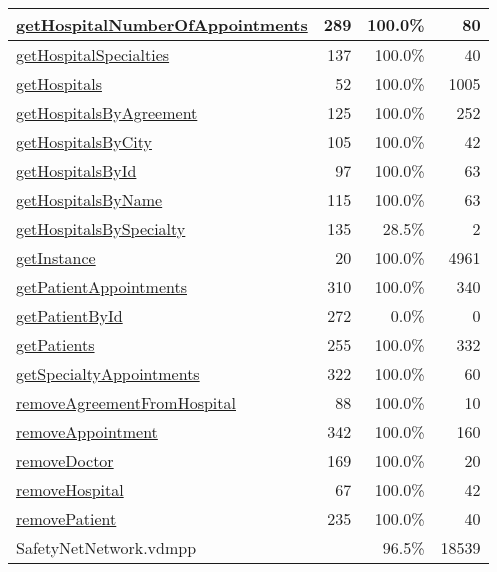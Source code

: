 \begin{longtable}{|l|r|r|r|}
\hline
\hyperref[getHospitalNumberOfAppointments:289]{getHospitalNumberOfAppointments} & 289&100.0\% & 80 \\
\hline
\hyperref[getHospitalSpecialties:137]{getHospitalSpecialties} & 137&100.0\% & 40 \\
\hline
\hyperref[getHospitals:52]{getHospitals} & 52&100.0\% & 1005 \\
\hline
\hyperref[getHospitalsByAgreement:125]{getHospitalsByAgreement} & 125&100.0\% & 252 \\
\hline
\hyperref[getHospitalsByCity:105]{getHospitalsByCity} & 105&100.0\% & 42 \\
\hline
\hyperref[getHospitalsById:97]{getHospitalsById} & 97&100.0\% & 63 \\
\hline
\hyperref[getHospitalsByName:115]{getHospitalsByName} & 115&100.0\% & 63 \\
\hline
\hyperref[getHospitalsBySpecialty:135]{getHospitalsBySpecialty} & 135&28.5\% & 2 \\
\hline
\hyperref[getInstance:20]{getInstance} & 20&100.0\% & 4961 \\
\hline
\hyperref[getPatientAppointments:310]{getPatientAppointments} & 310&100.0\% & 340 \\
\hline
\hyperref[getPatientById:272]{getPatientById} & 272&0.0\% & 0 \\
\hline
\hyperref[getPatients:255]{getPatients} & 255&100.0\% & 332 \\
\hline
\hyperref[getSpecialtyAppointments:322]{getSpecialtyAppointments} & 322&100.0\% & 60 \\
\hline
\hyperref[removeAgreementFromHospital:88]{removeAgreementFromHospital} & 88&100.0\% & 10 \\
\hline
\hyperref[removeAppointment:342]{removeAppointment} & 342&100.0\% & 160 \\
\hline
\hyperref[removeDoctor:169]{removeDoctor} & 169&100.0\% & 20 \\
\hline
\hyperref[removeHospital:67]{removeHospital} & 67&100.0\% & 42 \\
\hline
\hyperref[removePatient:235]{removePatient} & 235&100.0\% & 40 \\
\hline
\hline
SafetyNetNetwork.vdmpp & & 96.5\% & 18539 \\
\hline
\end{longtable}

